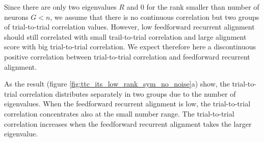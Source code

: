 \documentclass[11pt]{article}
\begin{document}
	Since there are only two eigenvalues $R$ and $0$ for the rank smaller than number of neurons $G < n$, we assume that there is no continuous correlation but two groups of trial-to-trial correlation values. However, low feedforward recurrent alignment should still correlated with small trail-to-trial correlation and large alignment score with big trial-to-trial correlation. We expect therefore here a discontinuous positive correlation between trial-to-trial correlation and feedforward recurrent alignment. 
	
	As the result (figure \ref{fig:ttc_its_low_rank_sym_no_noise}a) show, the trial-to-trial correlation distributes separately in two groups due to the number of eigenvalues. When the feedforward recurrent alignment is low, the trial-to-trial correlation concentrates also at the small number range. The trial-to-trial correlation increases when the feedforward recurrent alignment takes the larger eigenvalue. 
	
\end{document}
